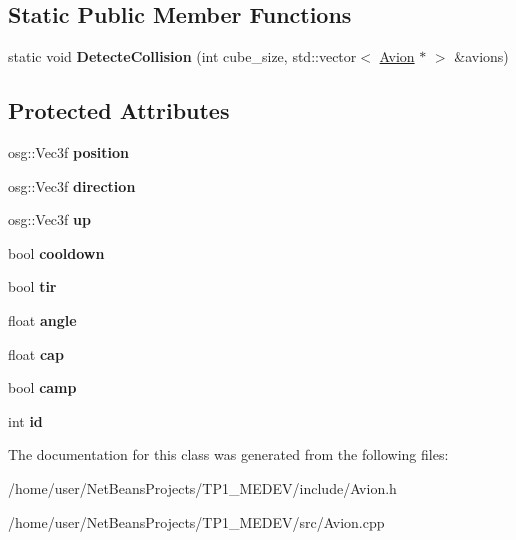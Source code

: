 \subsection*{Static Public Member Functions}
\begin{DoxyCompactItemize}
\item 
\hypertarget{classAvion_a0275f22a60502f7fa484a9ad3732623c}{static void {\bfseries Detecte\+Collision} (int cube\+\_\+size, std\+::vector$<$ \hyperlink{classAvion}{Avion} $\ast$ $>$ \&avions)}\label{classAvion_a0275f22a60502f7fa484a9ad3732623c}

\end{DoxyCompactItemize}
\subsection*{Protected Attributes}
\begin{DoxyCompactItemize}
\item 
\hypertarget{classAvion_a2d3644ca8e3a7fa7d7767684656d80d4}{osg\+::\+Vec3f {\bfseries position}}\label{classAvion_a2d3644ca8e3a7fa7d7767684656d80d4}

\item 
\hypertarget{classAvion_a639ae0bce47206b55a6cbccb280196ee}{osg\+::\+Vec3f {\bfseries direction}}\label{classAvion_a639ae0bce47206b55a6cbccb280196ee}

\item 
\hypertarget{classAvion_aac1e96e696cd92cd7de6e7411cac592d}{osg\+::\+Vec3f {\bfseries up}}\label{classAvion_aac1e96e696cd92cd7de6e7411cac592d}

\item 
\hypertarget{classAvion_a39494962a6e02b4c13add30c02b5e76b}{bool {\bfseries cooldown}}\label{classAvion_a39494962a6e02b4c13add30c02b5e76b}

\item 
\hypertarget{classAvion_a0f52ac044544fe77cb8cab7df9373e82}{bool {\bfseries tir}}\label{classAvion_a0f52ac044544fe77cb8cab7df9373e82}

\item 
\hypertarget{classAvion_a982a66e25347b89477fd571792dbe9b7}{float {\bfseries angle}}\label{classAvion_a982a66e25347b89477fd571792dbe9b7}

\item 
\hypertarget{classAvion_a65c17ac385732da39a58414e3aa1d447}{float {\bfseries cap}}\label{classAvion_a65c17ac385732da39a58414e3aa1d447}

\item 
\hypertarget{classAvion_abbd0d7b37c4607e2587691e51d443433}{bool {\bfseries camp}}\label{classAvion_abbd0d7b37c4607e2587691e51d443433}

\item 
\hypertarget{classAvion_a325e2d3272cbb7b9f177b9fde05cae9a}{int {\bfseries id}}\label{classAvion_a325e2d3272cbb7b9f177b9fde05cae9a}

\end{DoxyCompactItemize}


The documentation for this class was generated from the following files\+:\begin{DoxyCompactItemize}
\item 
/home/user/\+Net\+Beans\+Projects/\+T\+P1\+\_\+\+M\+E\+D\+E\+V/include/Avion.\+h\item 
/home/user/\+Net\+Beans\+Projects/\+T\+P1\+\_\+\+M\+E\+D\+E\+V/src/Avion.\+cpp\end{DoxyCompactItemize}
